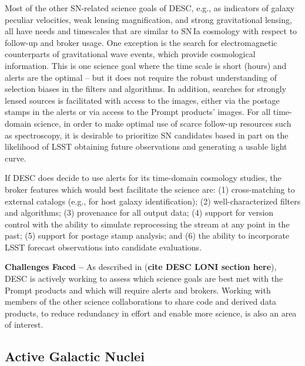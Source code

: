 Most of the other SN-related science goals of DESC, e.g., as indicators of galaxy peculiar velocities, weak lensing magnification, and strong gravitational lensing, all have needs and timescales that are similar to SN\,Ia cosmology with respect to follow-up and broker usage. One exception is the search for electromagnetic counterparts of gravitational wave events, which provide cosmological information. This is one science goal where the time scale is short (hours) and alerts are the optimal -- but it does not require the robust understanding of selection biases in the filters and algorithms. In addition, searches for strongly lensed sources is facilitated with access to the images, either via the postage stamps in the alerts or via access to the Prompt products' images. For all time-domain science, in order to make optimal use of scarce follow-up resources such as spectroscopy, it is desirable to prioritize SN candidates based in part on the likelihood of LSST obtaining future observations and generating a usable light curve. 

If DESC does decide to use alerts for its time-domain cosmology studies, the broker features which would best facilitate the science are: 
(1) cross-matching to external catalogs (e.g., for host galaxy identification);
(2) well-characterized filters and algorithms;
(3) provenance for all output data;
(4) support for version control with the ability to simulate reprocessing the stream at any point in the past; 
(5) support for postage stamp analysis; and
(6) the ability to incorporate LSST forecast observations into candidate evaluations.

{\bf Challenges Faced --} As described in ({\bf cite DESC LONI section here}), DESC is actively working to assess which science goals are best met with the Prompt products and which will require alerts and brokers. Working with members of the other science collaborations to share code and derived data products, to reduce redundancy in effort and enable more science, is also an area of interest. 

\subsection{Active Galactic Nuclei}\label{ssec:sci_agn}

